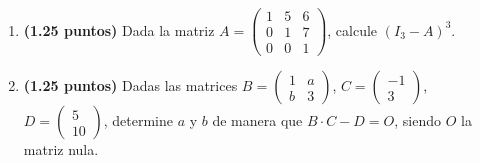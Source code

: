 
\begin{enumerate}[label=\alph*)]
\item \textbf{(1.25 puntos)} Dada la matriz $A=\begin{pmatrix}1&5&6\\0&1&7\\0&0&1\end{pmatrix}$, calcule $(I_3-A)^3$.
\item \textbf{(1.25 puntos)} Dadas las matrices $B=\begin{pmatrix}1&a\\b&3\end{pmatrix}$, $C=\begin{pmatrix}-1\\3\end{pmatrix}$, $D=\begin{pmatrix}5\\10\end{pmatrix}$, determine $a$ y $b$ de manera que $B\cdot C-D=O$, siendo $O$ la matriz nula.
\end{enumerate}
